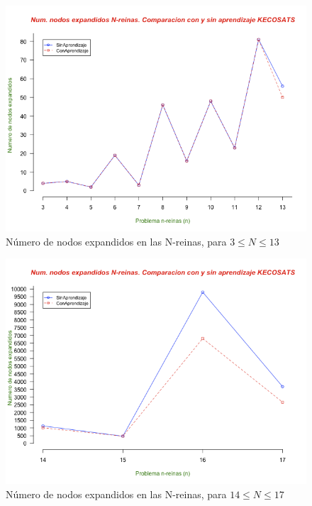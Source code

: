 \documentclass[12pt,lettersize,oneside]{article}
\begin{document}
\begin{figure}[!ht]\caption{Número de nodos expandidos en las N-reinas, para $3 \leq
    N \leq 13$}
\label{NodosExpandidosReinasPeq}
\includegraphics[scale=0.62]{figura21.png}
\end{figure}

\begin{figure}[!ht]\caption{Número de nodos expandidos en las N-reinas, para $14 \leq
    N \leq 17$}
\label{NodosExpandidosReinasPeq2}
\includegraphics[scale=0.62]{figura22.png}
\end{figure}
\end{document}
